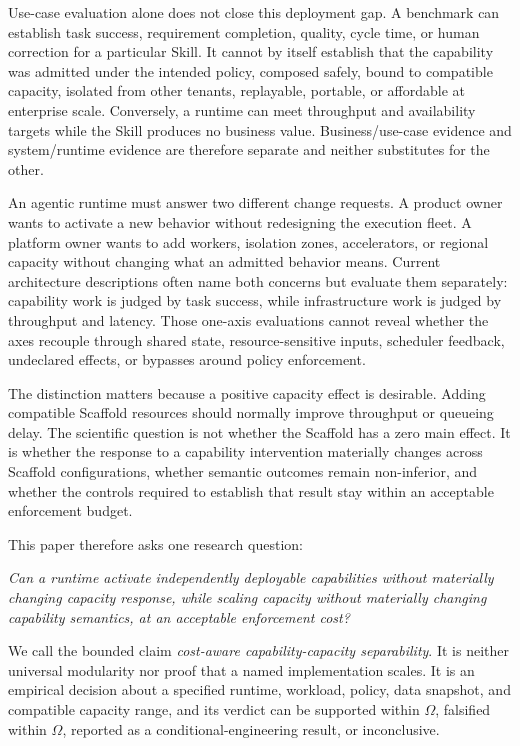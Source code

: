 \documentclass[11pt]{article}
\begin{document}
Use-case evaluation alone does not close this deployment gap. A benchmark can establish task success, requirement completion, quality, cycle time, or human correction for a particular Skill. It cannot by itself establish that the capability was admitted under the intended policy, composed safely, bound to compatible capacity, isolated from other tenants, replayable, portable, or affordable at enterprise scale. Conversely, a runtime can meet throughput and availability targets while the Skill produces no business value. Business/use-case evidence and system/runtime evidence are therefore separate and neither substitutes for the other.

An agentic runtime must answer two different change requests. A product owner wants to activate a new behavior without redesigning the execution fleet. A platform owner wants to add workers, isolation zones, accelerators, or regional capacity without changing what an admitted behavior means. Current architecture descriptions often name both concerns but evaluate them separately: capability work is judged by task success, while infrastructure work is judged by throughput and latency. Those one-axis evaluations cannot reveal whether the axes recouple through shared state, resource-sensitive inputs, scheduler feedback, undeclared effects, or bypasses around policy enforcement.

The distinction matters because a positive capacity effect is desirable. Adding compatible Scaffold resources should normally improve throughput or queueing delay. The scientific question is not whether the Scaffold has a zero main effect. It is whether the response to a capability intervention materially changes across Scaffold configurations, whether semantic outcomes remain non-inferior, and whether the controls required to establish that result stay within an acceptable enforcement budget.

This paper therefore asks one research question:

\textit{Can a runtime activate independently deployable capabilities without materially changing capacity response, while scaling capacity without materially changing capability semantics, at an acceptable enforcement cost?}

We call the bounded claim \textit{cost-aware capability-capacity separability}. It is neither universal modularity nor proof that a named implementation scales. It is an empirical decision about a specified runtime, workload, policy, data snapshot, and compatible capacity range, and its verdict can be supported within $\Omega$, falsified within $\Omega$, reported as a conditional-engineering result, or inconclusive.
\end{document}
